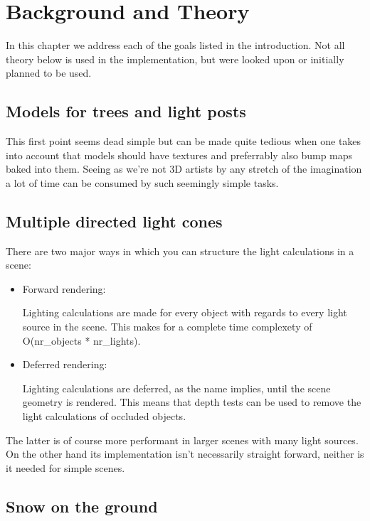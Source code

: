 \documentclass[a4paper,12pt]{article}
\begin{document}
\section{Background and Theory}

In this chapter we address each of the goals listed in the introduction. Not all theory below is used in the implementation, but were looked upon or initially planned to be used.

\subsection{Models for trees and light posts}

This first point seems dead simple but can be made quite tedious when one takes into account that models should have textures and preferrably also bump maps baked into them. Seeing as we're not 3D artists by any stretch of the imagination a lot of time can be consumed by such seemingly simple tasks.
 

\subsection{Multiple directed light cones}

There are two major ways in which you can structure the light calculations in a scene:

\begin{itemize}
\item Forward rendering:

  Lighting calculations are made for every object with regards to every light source in the scene. This makes for a complete time complexety of O(nr\_objects * nr\_lights).

\item Deferred rendering:

  Lighting calculations are deferred, as the name implies, until the scene geometry is rendered. This means that depth tests can be used to remove the light calculations of occluded objects.
\end{itemize}

The latter is of course more performant in larger scenes with many light sources. On the other hand its implementation isn't necessarily straight forward, neither is it needed for simple scenes.


\subsection{Snow on the ground}
\end{document}
